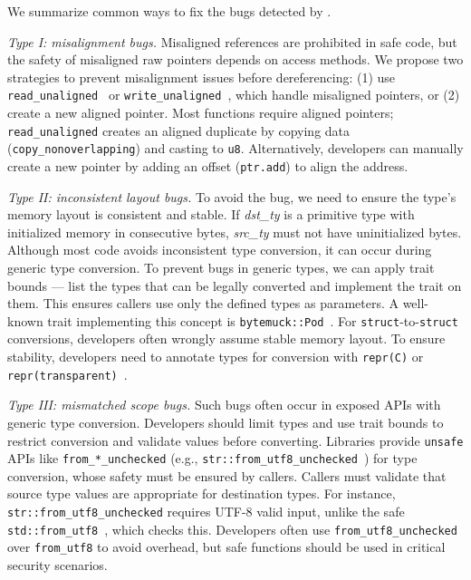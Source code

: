 \vspace{0.05in}
We summarize common ways to fix the bugs detected by \TN.


\noindent\emph{Type I: misalignment bugs.}
Misaligned references are prohibited in safe code, but the safety of misaligned raw pointers depends on access methods. We propose two strategies to prevent misalignment issues before dereferencing: (1) use \texttt{read\_unaligned}~\cite{readunalign} or \texttt{write\_unaligned}~\cite{writeunalign}, which handle misaligned pointers, or (2) create a new aligned pointer. Most functions require aligned pointers; \texttt{read\_unaligned} creates an aligned duplicate by copying data (\texttt{copy\_nonoverlapping}) and casting to \texttt{u8}. Alternatively, developers can manually create a new pointer by adding an offset (\texttt{ptr.add}) to align the address. 


\noindent\emph{Type II: inconsistent layout bugs.}
To avoid the \btwo bug, we need to ensure the type's memory layout is consistent and stable. If \textit{dst\_ty} is a primitive type with initialized memory in consecutive bytes, \textit{src\_ty} must not have uninitialized bytes. Although most code avoids inconsistent type conversion, it can occur during generic type conversion. 
%
To prevent bugs in generic types, we can apply trait bounds --- list the types that can be legally converted and implement the trait on them. This ensures callers use only the defined types as parameters. A well-known trait implementing this concept is \texttt{bytemuck::Pod}~\cite{Podinbyt5online}.
%
For \texttt{struct}-to-\texttt{struct} conversions, developers often wrongly assume stable memory layout. To ensure stability, developers need to annotate types for conversion with \texttt{repr(C)} or \texttt{repr(transparent)}~\cite{Typelayo51online}. 


\noindent\emph{Type III: mismatched scope bugs.} 
Such bugs often occur in exposed APIs with generic type conversion. 
Developers should limit types and use trait bounds to restrict conversion and validate values before converting.
Libraries provide \texttt{unsafe} APIs like \texttt{from\_*\_unchecked} (e.g., \texttt{str::from\_utf8\_unchecked}~\cite{strutf8unchecked}) for type conversion, whose safety must be ensured by callers. 
Callers must validate that source type values are appropriate for destination types. 
For instance, \texttt{str::from\_utf8\_unchecked} requires UTF-8 valid input, 
unlike the safe \texttt{std::from\_utf8}~\cite{strutf8}, which checks this. 
Developers often use \texttt{from\_utf8\_unchecked} over \texttt{from\_utf8} to avoid overhead, but safe functions should be used in critical security scenarios.




